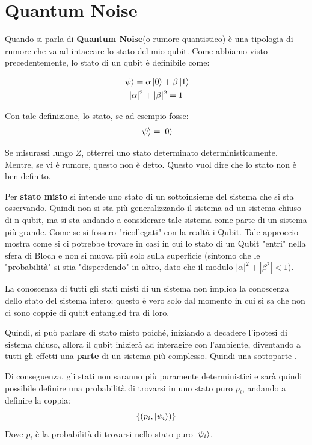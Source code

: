 \chapter{Quantum Noise}
Quando si parla di \textbf{Quantum Noise}(o rumore quantistico) è una tipologia di rumore che va ad intaccare lo stato del mio qubit. Come abbiamo visto precedentemente, lo stato di un qubit è definibile come:

\begin{gather*}
\ket{\psi} = \alpha \ket{0} + \beta \ket{1}\\
|\alpha|^2 + |\beta|^2 = 1
\end{gather*}

Con tale definizione, lo stato, se ad esempio fosse:
\begin{gather*}
\ket{\psi} = \ket{0}
\end{gather*}

Se misurassi lungo \(Z\), otterrei uno stato determinato deterministicamente. Mentre, se vi è rumore, questo non è detto. Questo vuol dire che lo stato non è ben definito.

Per \textbf{stato misto} si intende uno stato di un sottoinsieme del sistema che si sta osservando. Quindi non si sta più generalizzando il sistema ad un sistema chiuso di n-qubit, ma si sta andando a considerare tale sistema come parte di un sistema più grande. Come se si fossero "ricollegati" con la realtà i Qubit. Tale approccio mostra come si ci potrebbe trovare in casi in cui lo stato di un Qubit "entri" nella sfera di Bloch e non si muova più solo sulla superficie (sintomo che le "probabilità" si stia "disperdendo" in altro, dato che il modulo \(|\alpha|^2+|\beta^2|<1\)).

La conoscenza di tutti gli stati misti di un sistema non implica la conoscenza dello stato del sistema intero; questo è vero solo dal momento in cui si sa che non ci sono coppie di qubit entangled tra di loro.

Quindi, si può parlare di stato misto poiché, iniziando a decadere l'ipotesi di sistema chiuso, allora il qubit inizierà ad interagire con l'ambiente, diventando a tutti gli effetti una \textbf{parte} di un sistema più complesso. Quindi una sottoparte \cite{gentle2011quantum}.

Di conseguenza, gli stati non saranno più puramente deterministici e sarà quindi possibile definire una probabilità di trovarsi in uno stato puro \(p_i\), andando a definire la coppia:
\[
\{(p_i,\ket{\psi_i})\}
\]
Dove \(p_i\) è la probabilità di trovarsi nello stato puro \(\ket{\psi_i}\).





